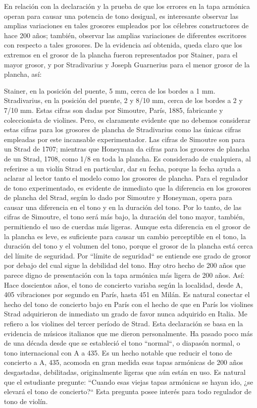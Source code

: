 \documentclass[12pt]{book}
\begin{document}
En relación con la declaración y la prueba de que los errores en la tapa armónica operan para causar una potencia de tono desigual, es interesante observar las amplias variaciones en tales grosores empleados por los célebres constructores de hace 200 años; también, observar las amplias variaciones de diferentes escritores con respecto a tales grosores. De la evidencia así obtenida, queda claro que los extremos en el grosor de la plancha fueron representados por Stainer, para el mayor grosor, y por Stradivarius y Joseph Guarnerius para el menor grosor de la plancha, así:

Stainer, en la posición del puente, 5 mm, cerca de los bordes a 1 mm. Stradivarius, en la posición del puente, 2 y 8/10 mm, cerca de los bordes a 2 y 7/10 mm. Estas cifras son dadas por Simoutre, París, 1885, fabricante y coleccionista de violines. Pero, es claramente evidente que no debemos considerar estas cifras para los grosores de plancha de Stradivarius como las únicas cifras empleadas por este incansable experimentador. Las cifras de Simoutre son para un Strad de 1707; mientras que Honeyman da cifras para los grosores de plancha de un Strad, 1708, como 1/8 en toda la plancha. Es considerado de cualquiera, al referirse a un violín Strad en particular, dar su fecha, porque la fecha ayuda a aclarar al lector tanto el modelo como los grosores de plancha. Para el regulador de tono experimentado, es evidente de inmediato que la diferencia en los grosores de plancha del Strad, según lo dado por Simoutre y Honeyman, opera para causar una diferencia en el tono y en la duración del tono. Por lo tanto, de las cifras de Simoutre, el tono será más bajo, la duración del tono mayor, también, permitiendo el uso de cuerdas más ligeras. Aunque esta diferencia en el grosor de la plancha es leve, es suficiente para causar un cambio perceptible en el tono, la duración del tono y el volumen del tono, porque el grosor de la plancha está cerca del límite de seguridad. Por ``límite de seguridad`` se entiende ese grado de grosor por debajo del cual sigue la debilidad del tono. Hay otro hecho de 200 años que parece digno de presentación con la tapa armónica más ligera de 200 años. Así: Hace doscientos años, el tono de concierto variaba según la localidad, desde A, 405 vibraciones por segundo en París, hasta 451 en Milán. Es natural conectar el hecho del tono de concierto bajo en París con el hecho de que en París los violines Strad adquirieron de inmediato un grado de favor nunca adquirido en Italia. Me refiero a los violines del tercer período de Strad. Esta declaración se basa en la evidencia de músicos italianos que me dieron personalmente. Ha pasado poco más de una década desde que se estableció el tono ``normal``, o diapasón normal, o tono internacional con A a 435. Es un hecho notable que reducir el tono de concierto a A, 435, acomoda en gran medida esas tapas armónicas de 200 años desgastadas, debilitadas, originalmente ligeras que aún están en uso. Es natural que el estudiante pregunte: ``Cuando esas viejas tapas armónicas se hayan ido, ¿se elevará el tono de concierto?`` Esta pregunta posee interés para todo regulador de tono de violín.
\end{document}
